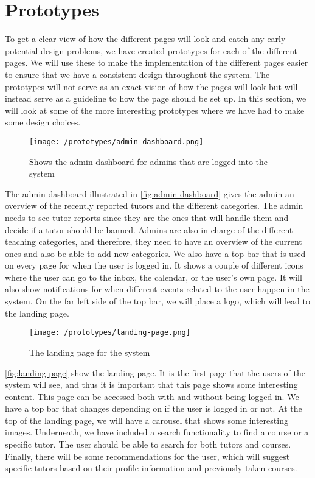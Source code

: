 \section{Prototypes}\label{sec:prototypes-design}
To get a clear view of how the different pages will look and catch any early potential design problems, we have created prototypes for each of the different pages. 
We will use these to make the implementation of the different pages easier to ensure that we have a consistent design throughout the system. 
The prototypes will not serve as an exact vision of how the pages will look but will instead serve as a guideline to how the page should be set up.
In this section, we will look at some of the more interesting prototypes where we have had to make some design choices.
\begin{figure}[H]
    \texttt{[image: /prototypes/admin-dashboard.png]}
     \caption{Shows the admin dashboard for admins that are logged into the system}
     \label{fig:admin-dashboard}
 \end{figure}
 \noindent
The admin dashboard illustrated in \autoref{fig:admin-dashboard} gives the admin an overview of the recently reported tutors and the different categories. 
The admin needs to see tutor reports since they are the ones that will handle them and decide if a tutor should be banned. 
Admins are also in charge of the different teaching categories, and therefore, they need to have an overview of the current ones and also be able to add new categories.
We also have a top bar that is used on every page for when the user is logged in. It shows a couple of different icons where the user can go to the inbox, the calendar, or the user's own page. 
It will also show notifications for when different events related to the user happen in the system. 
On the far left side of the top bar, we will place a logo, which will lead to the landing page.
\begin{figure}[H]
    \centering
   \texttt{[image: /prototypes/landing-page.png]}
    \caption{The landing page for the system}
    \label{fig:landing-page}
\end{figure}
\noindent
\autoref{fig:landing-page} show the landing page.
It is the first page that the users of the system will see, and thus it is important that this page shows some interesting content. 
This page can be accessed both with and without being logged in. 
We have a top bar that changes depending on if the user is logged in or not. 
At the top of the landing page, we will have a carousel that shows some interesting images.
Underneath, we have included a search functionality to find a course or a specific tutor. 
The user should be able to search for both tutors and courses. 
Finally, there will be some recommendations for the user, which will suggest specific tutors based on their profile information and previously taken courses.

